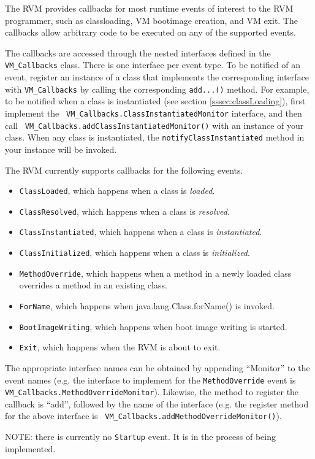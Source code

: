 The RVM provides callbacks for most runtime events of interest to the RVM
programmer, such as classloading, VM bootimage creation, and VM exit.  The
callbacks allow arbitrary code to be executed on any of the supported events.

The callbacks are accessed through the nested interfaces defined in the {\tt
VM\_Callbacks} class.  There is one interface per event type.  To be notified
of an event, register an instance of a class that implements the corresponding
interface with {\tt VM\_Callbacks} by calling the corresponding {\tt add...()}
method.  For example, to be notified when a class is instantiated (see section
\ref{sssec:classLoading}), first implement the {\tt
VM\_Callbacks.ClassInstantiatedMonitor} interface, and then call {\tt
VM\_Callbacks.addClassInstantiatedMonitor()} with an instance of your class.
When any class is instantiated, the {\tt notifyClassInstantiated} method in
your instance will be invoked.

The RVM currently supports callbacks for the following events.
\begin{itemize}
\item {\tt ClassLoaded}, which happens when a class is {\em loaded}.
\item {\tt ClassResolved}, which happens when a class is {\em resolved}.
\item {\tt ClassInstantiated}, which happens when a class is {\em
instantiated}.
\item {\tt ClassInitialized}, which happens when a class is {\em initialized}.
\item {\tt MethodOverride}, which happens when a method in a newly loaded class
overrides a method in an existing class.
\item {\tt ForName}, which happens when java.lang.Class.forName() is invoked.
\item {\tt BootImageWriting}, which happens when boot image writing is started.
\item {\tt Exit}, which happens when the RVM is about to exit.
\end{itemize}
The appropriate interface names can be obtained by appending ``Monitor'' to the
event names (e.g. the interface to implement for the {\tt MethodOverride} event
is {\tt VM\_Callbacks.MethodOverrideMonitor}).  Likewise, the method to
register the callback is ``add'', followed by the name of the interface (e.g.
the register method for the above interface is {\tt
VM\_Callbacks.addMethodOverrideMonitor()}).

NOTE: there is currently no {\tt Startup} event.  It is in the process of being
implemented.

